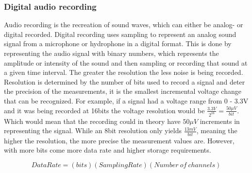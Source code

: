 \subsubsection{Digital audio recording}\label{sec:DigitalAudiRec}


Audio recording is the recreation of sound waves, which can either be analog- or digital recorded.
Digital recording uses sampling to represent an analog sound signal from a microphone or hydrophone in a digital format.
This is done by representing the audio signal with binary numbers, which represents the amplitude or intensity of the sound and then sampling or recording that sound at a given time interval.
The greater the resolution the less noise is being recorded.
Resolution is determined by the number of bits used to record a signal and deter the precision of the measurements, it is the smallest incremental voltage change that can be recognized.
For example, if a signal had a voltage range from 0 - 3.3V and it was being recorded at 16bits the voltage resolution would be $\frac{3.3V}{2^{16}} = \frac{50\mu V}{bit}$.
Which would mean that the recording could in theory have $50\mu V$ increments in representing the signal.  
While an 8bit resolution only yields $\frac{13mV}{bit}$, meaning the higher the resolution, the more precise the measurement values are.
However, with more bits come more data rate and higher storage requirements.

\begin{equation}
    Data Rate = (bits)(Sampling Rate)(Number~of~channels) 
    \label{eq:dataRate}
\end{equation}

